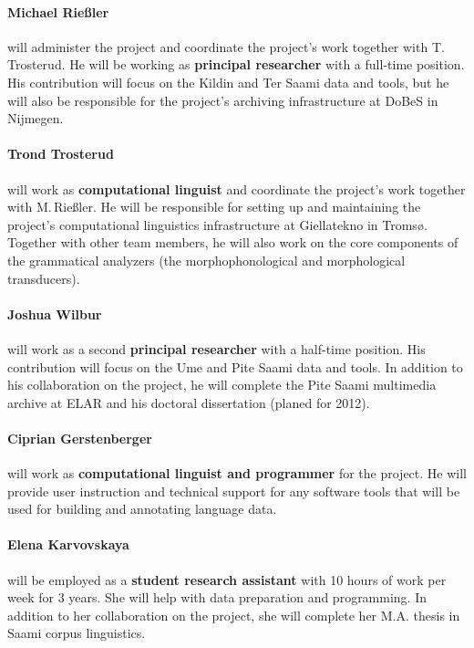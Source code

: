 \documentclass[a4paper,12pt]{article}
\begin{document}
{{\paragraph{Michael Rießler} will administer the project and coordinate the project's work together with T.\,Trosterud. He will be working as {\bf principal researcher} with a full-time position. His contribution will focus on the Kildin and Ter Saami data and tools, but he will also be responsible for the project's archiving infrastructure at DoBeS in Nijmegen.

\paragraph{Trond Trosterud} will work as {\bf computational linguist} and coordinate the project's work together with M.\,Rießler. He will be responsible for setting up and maintaining the project's computational linguistics infrastructure at Giellatekno in Tromsø. Together with other team members, he will also work on the core components of the grammatical analyzers (the morphophonological and morphological transducers).

\paragraph{Joshua Wilbur} will work as a second {\bf principal researcher} with a half-time position. His contribution will focus on the Ume and Pite Saami data and tools. In addition to his collaboration on the project, he will complete the Pite Saami multimedia archive at ELAR and his doctoral dissertation (planed for 2012).

\paragraph{Ciprian Gerstenberger} will work as {\bf computational linguist and programmer} for the project. He will provide user instruction and technical support for any software tools that will be used for building and annotating language data. 

\paragraph{Elena Karvovskaya} will be employed as a \textbf{student research assistant} with 10 hours of work per week for 3 years. She will help with data preparation and programming. In addition to her collaboration on the project, she will complete her M.A. thesis in Saami corpus linguistics.

}}
\end{document}
